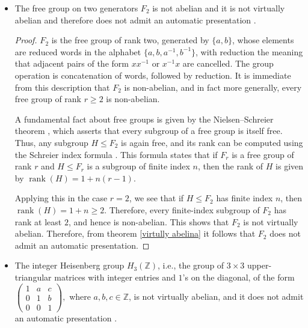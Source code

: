 \documentclass{pracalicmgr2025}
\theoremstyle{plain}            %
\theoremstyle{remark}           %
\theoremstyle{definition}       %
\begin{document}
\begin{itemize}
    \item The free group on two generators $F_2$ is not abelian and it is not virtually abelian and therefore does not admit an automatic presentation \cite{OliverGraham2005}. 
        \begin{proof}  
         $F_{2}$ is the free group of rank two, generated by $\{a,b\}$, whose elements are reduced words in the alphabet $\{a, b, a^{-1}, b^{-1}\}$, with reduction the meaning that adjacent pairs of the form $xx^{-1}$ or $x^{-1}x$ are cancelled. The group operation is concatenation of words, followed by reduction. It is immediate from this description that $F_{2}$ is non-abelian, and in fact more generally, every free group of rank $r \geq 2$ is non-abelian.  
        
        A fundamental fact about free groups is given by the Nielsen--Schreier theorem \cite{stillwell2012classical}, which asserts that every subgroup of a free group is itself free. Thus, any subgroup $H \leq F_{2}$ is again free, and its rank can be computed using the Schreier index formula \cite{may1999concise}. This formula states that if $F_{r}$ is a free group of rank $r$ and $H \leq F_{r}$ is a subgroup of finite index $n$, then the rank of $H$ is given by  
        $ \operatorname{rank}(H) = 1 + n(r-1). $  
        
        Applying this in the case $r = 2$, we see that if $H \leq F_{2}$ has finite index $n$, then  
        $ \operatorname{rank}(H) = 1+n \geq 2. $  
        Therefore, every finite-index subgroup of $F_{2}$ has rank at least $2$, and hence is non-abelian. This shows that $F_{2}$ is not virtually abelian. Therefore, from theorem \ref{virtully abelina} it follows that $F_{2}$ does not admit an automatic presentation.  
        \end{proof}

    
        \item The integer Heisenberg group $H_3(\mathbb{Z})$, i.e., the group of $3 \times 3$ upper-triangular matrices with integer entries and $1$'s on the diagonal, of the form  $
        \begin{pmatrix}
        1 & a & c \\
        0 & 1 & b \\
        0 & 0 & 1
        \end{pmatrix},
        $
        where $a, b, c \in \mathbb{Z}$, is not virtually abelian, and it does not admit an automatic presentation \cite{OliverGraham2005}.   
 
\end{itemize}
\end{document}

